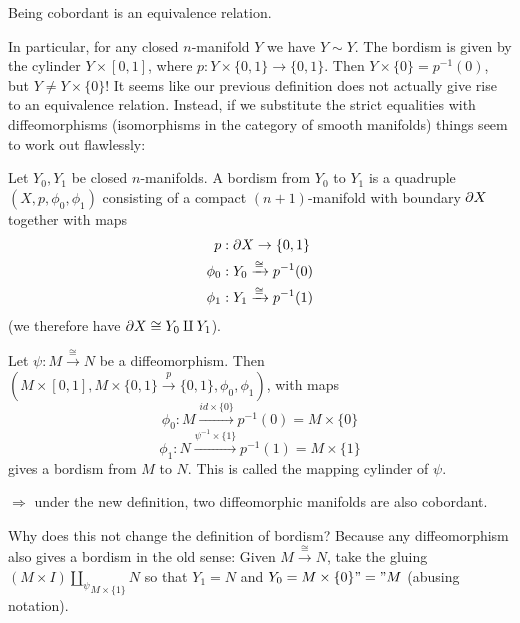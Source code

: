 \begin{rmnd}
Being cobordant is an equivalence relation.
\end{rmnd} 

\noindent In particular, for any closed $n$-manifold $Y$ we have $Y\sim Y$. The bordism is given by the cylinder $Y\times [0,1]$, where $p:Y\times\{0,1\}\to \{0,1\}$. Then $Y\times\{0\}=p^{-1}(0)$, but $Y\neq Y\times\{0\}$! 
It seems like our previous definition does not actually give rise to an equivalence relation. 
Instead, if we substitute the strict equalities with diffeomorphisms (isomorphisms in the category of smooth manifolds) things seem to work out flawlessly:

\begin{defn}
\label{NewDefBord}
    Let $Y_0, Y_1$ be closed $n$-manifolds. A bordism from $Y_0$ to $Y_1$ is a quadruple $(X,p,\phi_{0},\phi_{1})$ consisting of a compact $(n+1)$-manifold with boundary $\partial X$ together with maps 
    \begin{align*}
        p&: \partial X \to \{0,1\}        \\
        \phi_{0}&:Y_{0}\xrightarrow{\cong} p^{-1}(0) \\
        \phi_{1}&:Y_{1}\xrightarrow{\cong} p^{-1}(1)
    \end{align*}
    (we therefore have $\partial X \cong Y_0 \amalg Y_1$).
\end{defn}

\begin{ex}
    Let $\psi:M\xrightarrow{\cong} N$ be a diffeomorphism.
    Then $(M\times [0,1], M\times\{0,1\}\xrightarrow{p}\{0,1\}, \phi_0, \phi_1)$, with maps
    $$\phi_0:M\xrightarrow{id\times\{0\}}p^{-1}(0)=M\times \{0\}$$
    $$\phi_1:N\xrightarrow{\psi^{-1}\times\{1\}}p^{-1}(1)=M\times\{1\}$$
    gives a bordism from $M$ to $N$.
    This is called the mapping cylinder of $\psi$. 
    
    \noindent$\Rightarrow$ under the new definition,  two diffeomorphic manifolds are also cobordant.
\end{ex}


Why does this not change the definition of bordism?
Because any diffeomorphism also gives a bordism in the old sense:
Given $M\xrightarrow{\cong}N$, take the gluing $(M\times I)\underset{M\times\{1\}}{\coprod_{\psi}}N$ so that $Y_1=N$ and $Y_0=M\times \{0\}"="M$ (abusing notation).

